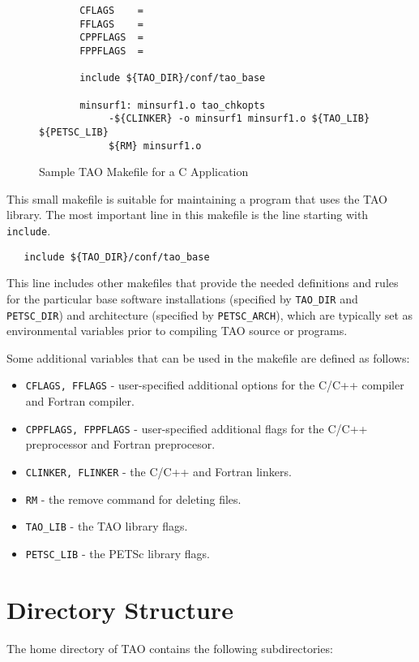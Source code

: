 \begin{figure}[tbh]
{\footnotesize
\begin{verbatim}   
       CFLAGS    = 
       FFLAGS    = 
       CPPFLAGS  =
       FPPFLAGS  =
       
       include ${TAO_DIR}/conf/tao_base
   
       minsurf1: minsurf1.o tao_chkopts
            -${CLINKER} -o minsurf1 minsurf1.o ${TAO_LIB} ${PETSC_LIB}
            ${RM} minsurf1.o
\end{verbatim} 
\noindent
}
\caption{Sample TAO Makefile for a C Application}
\label{fig:make3}
\end{figure}
This small makefile is suitable for maintaining a  program that
uses the TAO library.  The most important line in this makefile is the
line starting with {\tt include}.
\begin{verbatim}
   include ${TAO_DIR}/conf/tao_base
\end{verbatim}
\noindent %
This line includes other makefiles that provide the needed definitions
and rules for the particular base software installations (specified by
{\tt TAO\_DIR} and {\tt PETSC\_DIR}) and architecture
(specified by {\tt PETSC\_ARCH}), which are typically set as
environmental variables prior to compiling TAO source or programs.
 
Some additional variables that can be used in the makefile are defined
as follows:
\begin{itemize}
\item \texttt{CFLAGS, FFLAGS} - user-specified additional options for the
  C/C++ compiler and Fortran compiler.
\item \texttt{CPPFLAGS, FPPFLAGS} - user-specified additional flags
        for the C/C++ preprocessor and Fortran preprocesor.
\item \texttt{CLINKER, FLINKER} - the C/C++ and Fortran linkers. 
\item \texttt{RM} - the remove command for deleting files.
\item \texttt{TAO\_LIB} - the TAO library flags.
\item \texttt{PETSC\_LIB} - the PETSc library flags.
\end{itemize}

\section{Directory Structure}

The home directory of TAO contains the following subdirectories:

